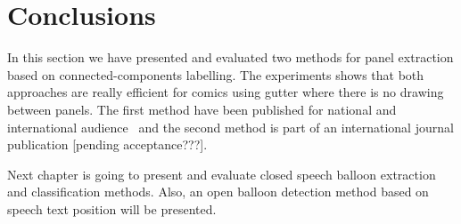 


\section{Conclusions}
\label{sec:se:conclusion}
In this section we have presented and evaluated two methods for panel extraction based on connected-components labelling.
The experiments shows that both approaches are really efficient for comics using gutter where there is no drawing between panels.
The first method have been published for national and international audience~\cite{rigaud2012extraction,Rigaud2012LNCS} and the second method is part of an international journal publication [pending acceptance???].


Next chapter is going to present and evaluate closed speech balloon extraction and classification methods.
Also, an open balloon detection method based on speech text position will be presented.


